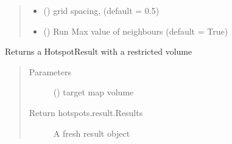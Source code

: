 \documentclass[letterpaper,10pt,english]{sphinxmanual}
\begin{document}
\begin{fulllineitems}
\begin{fulllineitems}
\begin{quote}
\begin{description}
\begin{itemize}
\item {} 
 () \textendash{} grid spacing, (default = 0.5)

\item {} 
 () \textendash{} Run Max value of neighbours (default = True)

\end{itemize}

\end{description}\end{quote}

\end{fulllineitems}


\begin{fulllineitems}
\label{\detokenize{result_api:hotspots.result.Extractor.extract_volume}}
Returns a HotspotResult with a restricted volume
\begin{quote}\begin{description}
\item[{Parameters}] \leavevmode
{} () \textendash{} target map volume

\item[{Return hotspots.result.Results}] \leavevmode
A fresh result object

\end{description}\end{quote}

\end{fulllineitems}


\end{fulllineitems}

\end{document}
